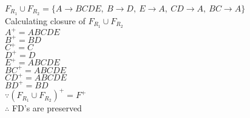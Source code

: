 \documentclass[12pt]{article}
\begin{document}
$F_{R_1} \cup F_{R_2} = \{A \rightarrow BCDE,\ B \rightarrow D,\ E \rightarrow A,\ CD \rightarrow A,\ BC \rightarrow A\}$\\

Calculating closure of $F_{R_1} \cup F_{R_2}$\\

$A^+ =ABCDE$\\
${B}^+=BD$\\
${C}^+=C$\\
${D}^+=D$\\
${E}^+=ABCDE$\\
${BC}^+= ABCDE$\\
${CD}^+= ABCDE$\\
${BD}^+=BD$\\

$\because (F_{R_1} \cup F_{R_2})^+ = F^+$\\
$\therefore$ FD's are preserved\\








\end{document}
